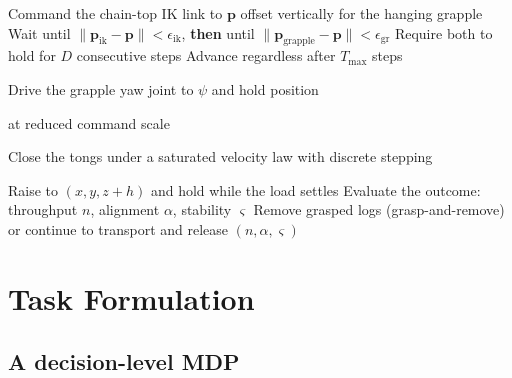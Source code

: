 \begin{algorithm}[t]
\caption{Grasp-cycle state machine, shared by every method in this thesis}
\label{alg:fsm}
\begin{algorithmic}

  \State Command the chain-top IK link to $\mathbf{p}$ offset vertically for the hanging grapple
  \State Wait until $\lVert \mathbf{p}_{\mathrm{ik}} - \mathbf{p} \rVert < \epsilon_{\mathrm{ik}}$,
         \textbf{then} until $\lVert \mathbf{p}_{\mathrm{grapple}} - \mathbf{p} \rVert < \epsilon_{\mathrm{gr}}$
  \State Require both to hold for $D$ consecutive steps
  \State Advance regardless after $T_{\max}$ steps
\EndFunction

\State {}

\State Drive the grapple yaw joint to $\psi$ and hold position

\State {} at reduced command scale

\State Close the tongs under a saturated velocity law with discrete stepping

\State Raise to $(x, y, z + h)$ and hold while the load settles
\State Evaluate the outcome: throughput $n$, alignment $\alpha$, stability $\varsigma$
\State Remove grasped logs (grasp-and-remove) or continue to transport and release
\State \Return $(n, \alpha, \varsigma)$
\end{algorithmic}
\end{algorithm}

\section{Task Formulation}
\label{sec:sim_task}

\subsection{A decision-level MDP}

